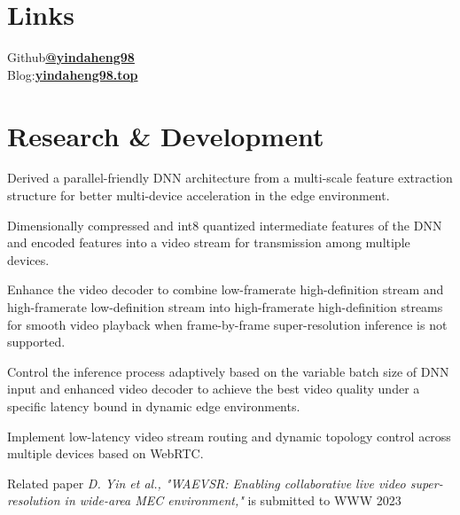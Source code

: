 \documentclass[]{deedy-resume-openfont}
\begin{document}
\begin{minipage}[t]{0.22\textwidth}
\section{Links}
Github\href{https://github.com/yindaheng98}{\bf @yindaheng98} \\
Blog:\href{http://www.yindaheng98.top}{\bf yindaheng98.top} \\
\sectionsep

\end{minipage} 
\hfill
\begin{minipage}[t]{0.77\textwidth} 


\section{Research \& Development}
\vspace{\topsep}
\begin{tightemize}
    \item Derived a parallel-friendly DNN architecture from a multi-scale feature extraction structure for better multi-device acceleration in the edge environment. %
    \item Dimensionally compressed and int8 quantized intermediate features of the DNN and encoded features into a video stream for transmission among multiple devices. %
    \item Enhance the video decoder to combine low-framerate high-definition stream and high-framerate low-definition stream into high-framerate high-definition streams for smooth video playback when frame-by-frame super-resolution inference is not supported. %
    \item Control the inference process adaptively based on the variable batch size of DNN input and enhanced video decoder to achieve the best video quality under a specific latency bound in dynamic edge environments.
    \item Implement low-latency video stream routing and dynamic topology control across multiple devices based on WebRTC.
    \item Related paper \textit{D. Yin et al., "WAEVSR: Enabling collaborative live video super-resolution in wide-area MEC environment,"} is submitted to WWW 2023
\end{tightemize}
\sectionsep



\end{minipage}
\end{document}
